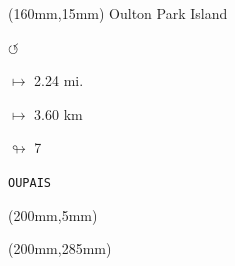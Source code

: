 \begin{textblock*}{40mm}(160mm,15mm)%
Oulton Park Island
\par \Huge$\circlearrowleft$
\Large
\par$\mapsto$ 2.24 mi.
\par$\mapsto$ 3.60 km
\par$\looparrowright$ 7
\par\hfill\tiny\tt OUPAIS\\
\end{textblock*}
\begin{textblock*}{20mm}(200mm,5mm)%
\fbox{\thepage}
\end{textblock*}
\begin{textblock*}{20mm}(200mm,285mm)%
\fbox{\thepage}
\end{textblock*}
\null\newpage

